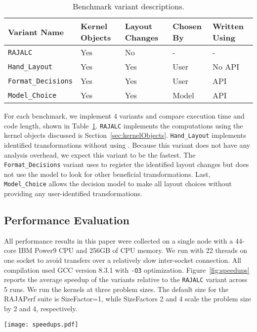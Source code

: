 \begin{table}
	\centering
	\begin{tabular}{| p{2.4cm} | p{1.1cm} | p{1.1cm} | p{1cm} | p{1cm}|}
		\hline
			\raggedright Variant \linebreak Name & \raggedright Kernel Objects & \raggedright Layout Changes & \raggedright Chosen By &  Written Using \tabularnewline
		\hline
		\verb.RAJALC. & Yes & No & - & - \\
		\verb.Hand_Layout. & Yes & Yes & User & No API \\
		\verb.Format_Decisions. & Yes & Yes & User & API \\
		\verb.Model_Choice. & Yes & Yes & Model & API \\
		\hline
	\end{tabular}
	\caption{Benchmark variant descriptions.}
	\label{VariantDescription}
\end{table}
For each benchmark, we implement 4 variants and compare execution time and code length, shown in Table~\ref{VariantDescription}.
\verb.RAJALC. implements the computations using the kernel objects discussed is Section~\ref{sec:kernelObjects}. 
\verb.Hand_Layout. implements identified transformations without using \FormatDecisions. 
Because this variant does not have any analysis overhead, we expect this variant to be the fastest.
The \verb.Format_Decisions. variant uses \FormatDecisions to register the identified layout changes but does not use the model to look for other beneficial transformations.
Last, \verb.Model_Choice. allows the decision model to make all layout choices without providing any user-identified transformations.

\subsection{Performance Evaluation}
All performance results in this paper were collected on a single node with a 44-core IBM Power9 CPU and 256GB of CPU memory. 
We run with 22 threads on one socket to avoid transfers over a relatively slow inter-socket connection.
All compilation used GCC version 8.3.1 with \verb.-O3. optimization.
\label{sec:systemDetails}
Figure~\ref{fig:speedups} reports the average speedup of the variants relative to the \verb.RAJALC. variant across 5 runs. 
We run the kernels at three problem sizes.
The default size for the RAJAPerf suite is SizeFactor=1, while SizeFactors 2 and 4 scale the problem size by 2 and 4, respectively.

\begin{figure*}
	\texttt{[image: speedups.pdf]}
	\caption{Relative speedups of the different variants for different problem size factors. Speedup is calculated in reference to the RAJALC variant. Higher is better.}
	\label{fig:speedups}

\end{figure*}

